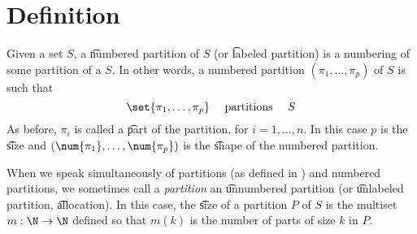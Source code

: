 
\section*{Definition}

Given a set $S$, a \t{numbered partition} of $S$ (or \t{labeled partition}) is a numbering of some partition of a $S$.
In other words, a numbered partition $(\pi _1, \dots , \pi _p)$ of $S$ is such that
\[
\set{\pi _1, \dots , \pi _p} \quad \text{ partitions } \quad S
\]
As before, $\pi _i$ is called a \t{part} of the partition, for $i = 1, \dots , n$.
In this case $p$ is the \t{size} and $(\num{\pi _1}, \dots , \num{\pi _p})$ is the \t{shape} of the numbered partition.

When we speak simultaneously of partitions (as defined in ) and numbered partitions, we sometimes call a \textit{partition} an \t{unnumbered partition} (or \t{unlabeled partition}, \t{allocation}).
In this case, the \t{size} of a partition $P$ of $S$ is the multiset $m: \N   \to \N  $ defined so that $m(k)$ is the number of parts of size $k$ in $P$.

\blankpage